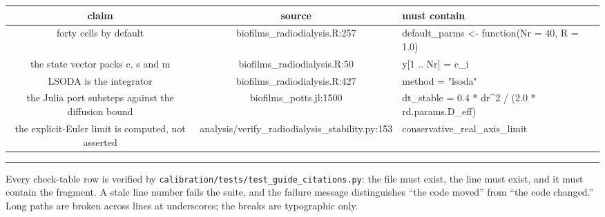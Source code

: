 \documentclass[11pt]{article}
\newcommand{\us}{\_\allowbreak}
\newcommand{\checkhead}{%
  \toprule
  \textbf{\normalsize claim} & \textbf{\normalsize source} & \textbf{\normalsize must contain} \\
  \midrule
}
\begin{document}
\begin{longtable}{CSF}
\checkhead
\endhead
forty cells by default
  & biofilms\us radiodialysis.R:257
  & default\_parms <- function(Nr = 40, R = 1.0) \\[0.35em]
the state vector packs c, s and m
  & biofilms\us radiodialysis.R:50
  & y[1 .. Nr]        = c\_i \\[0.35em]
LSODA is the integrator
  & biofilms\us radiodialysis.R:427
  & method = "lsoda" \\[0.35em]
the Julia port substeps against the diffusion bound
  & biofilms\us potts.jl:1500
  & dt\_stable = 0.4 * dr\^{}2 / (2.0 * rd.params.D\_eff) \\[0.35em]
the explicit-Euler limit is computed, not asserted
  & analysis/verify\us radiodialysis\us stability.py:153
  & conservative\_real\_axis\_limit \\
\bottomrule
\end{longtable}

\vspace{1.2\baselineskip}
{\footnotesize\color{rule}\hrule\vspace{0.7em}
Every check-table row is verified by
\texttt{calibration/tests/test\_guide\_citations.py}: the file must exist, the line must
exist, and it must contain the fragment. A stale line number fails the suite, and the failure
message distinguishes ``the code moved'' from ``the code changed.'' Long paths are broken across lines at underscores; the breaks are typographic only.}
\end{document}
